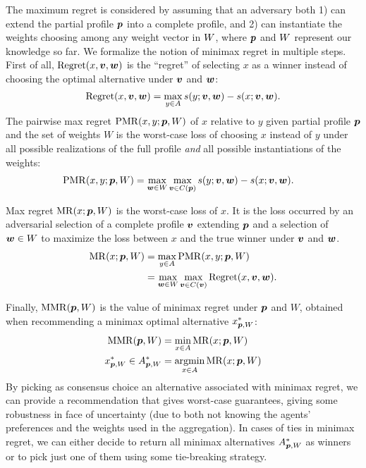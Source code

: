The maximum regret is considered by assuming that an adversary both 1) can extend the partial profile ${\bm{p}}$ into a complete profile, and 2) can instantiate the weights choosing among any weight vector in $W$, where ${\bm{p}}$ and $W$ represent our knowledge so far.
We formalize the notion of minimax regret in multiple steps.
First of all, $\operatorname{Regret}(x, \bm{v}, \bm{w})$ is the “regret” of selecting $x$ as a winner instead of choosing the optimal alternative under $\bm{v}$ and $\bm{w}$:
\[\operatorname{Regret}(x, \bm{v}, \bm{w}) = \max_{y \in A} s(y; \bm{v},\bm{w}) - s(x; \bm{v}, \bm{w}).\]
The pairwise max regret $\operatorname{PMR}(x,y;{\bm{p}},W)$ of $x$ relative to $y$ given partial profile ${\bm{p}}$ and the set of weights $W$
is the worst-case loss of choosing $x$ instead of $y$ under all possible realizations of the full profile {\em and} all possible instantiations of the weights:
\begin{align}
\operatorname{PMR}(x,y; {\bm{p}}, W) & = \max_{\bm{w} \in W} \max_{\bm{v} \in C({\bm{p}})} s(y; \bm{v},\bm{w}) - s(x; \bm{v},\bm{w}).
\end{align}

Max regret $\operatorname{MR}(x;{\bm{p}},W)$ is the worst-case loss of $x$. It is the loss occurred by an adversarial selection of a complete profile $\bm{v}$ extending ${\bm{p}}$ and a selection of $\bm{w} \in W$ to maximize the loss between $x$ and the true winner under $\bm{v}$ and $\bm{w}$.
\begin{align}
\operatorname{MR}(x; {\bm{p}}, W) & = \max_{y \in A} \operatorname{PMR}(x,y; {\bm{p}}, W)\\
& = \max_{\bm{w} \in W} \max_{\bm{v} \in C(\bm{v})} \operatorname{Regret}(x, \bm{v}, \bm{w}).
\end{align}

Finally,  $\operatorname{MMR}({\bm{p}},W)$ is the value of minimax regret under ${\bm{p}}$ and $W$, obtained when recommending a minimax optimal alternative $x^*_{{\bm{p}}, W}$:
\begin{align*}
\operatorname{MMR}({\bm{p}},W) & = \min_{x \in A} \operatorname{MR}(x;{\bm{p}},W) \\
x^{*}_{{\bm{p}},W} \in A^*_{{\bm{p}}, W} & = \operatorname*{argmin}_{x \in A} \operatorname{MR}(x;{\bm{p}},W) 
\end{align*}
By picking as consensus choice
 an alternative associated with minimax regret, we can provide a recommendation that gives worst-case guarantees, giving some robustness in face of uncertainty (due to both not knowing the agents' preferences and the weights used in the aggregation). 
In cases of ties in minimax regret, we can either decide to return all minimax alternatives $A^*_{{\bm{p}}, W}$ as winners or to pick just one of them using some tie-breaking strategy.

